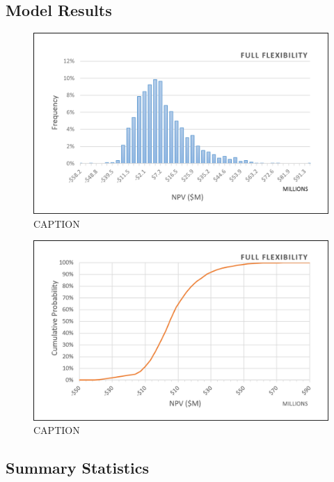\subsection{Model Results}
\label{ch6:reduce_results}

\begin{figure}[!htp]
\centering
\includegraphics[width=.98\textwidth]{templates/images/Figure-Reduce_Case_Histogram.png}
\caption[Full Flexibility Case histogram]{CAPTION}
\label{fig:reduce_case_hist}
\end{figure}

\begin{figure}[!htp]
\centering
\includegraphics[width=.98\textwidth]{templates/images/Figure-Reduce_Case_CDF.png}
\caption[Full Flexibility Case CDF]{CAPTION}
\label{fig:reduce_case_cdf}
\end{figure}

\subsection{Summary Statistics}
\label{ch6:reduce_stats}

